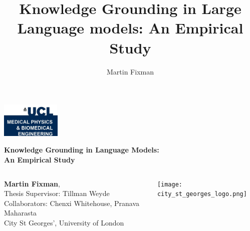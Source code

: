 \documentclass[10pt]{beamer}
\title{Knowledge Grounding in Large Language models: An Empirical Study}
\author{Martin Fixman}
\begin{document}
	
\begin{frame}{}
	\raggedleft
	\includegraphics[width=80pt]{ucl_medical_logo}

	\vfill{}

	\centering
	{
		\Large\bfseries
		Knowledge Grounding in Language Models: \\ An Empirical Study	
	}

	\vfill{}

	\begin{columns}[c]
		{\large \textbf{Martin Fixman}}, \\
		Thesis Supervisor: Tillman Weyde \\
		Collaborators: Chenxi Whitehouse, Pranava Maharasta \\[1em]
		City St Georges', University of London

		\texttt{[image: city\_st\_georges\_logo.png]}
	\end{columns}
\end{frame}
\end{document}
